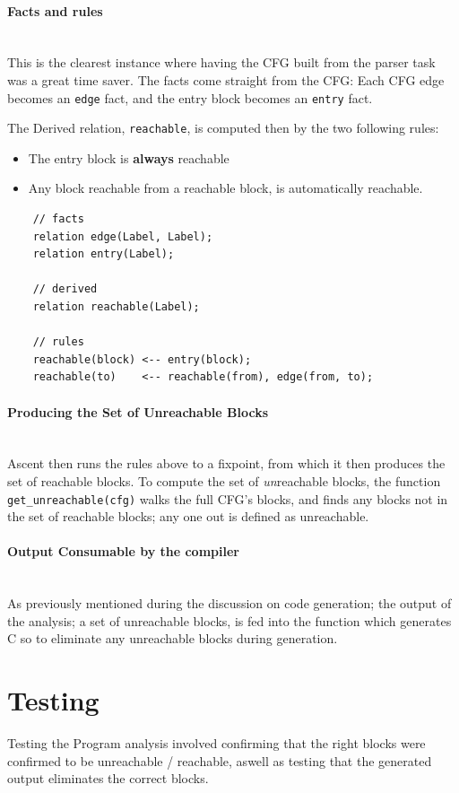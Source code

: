 \documentclass[11pt,a4paper,oneside]{report}
\begin{document}
	\paragraph{Facts and rules}\mbox{}\\
	This is the clearest instance where having the CFG built from the parser task was a great time saver. The facts come straight from the CFG: Each CFG edge becomes an \texttt{edge} fact, and the entry block becomes an \texttt{entry} fact. 
	
	The Derived relation, \texttt{reachable}, is computed then by the two following rules: 
	\begin{itemize}
		\item The entry block is \textbf{always} reachable
		\item Any block reachable from a reachable block, is automatically reachable. 
	\end{itemize}
	
	\begin{lstlisting}
	// facts
	relation edge(Label, Label);
	relation entry(Label);
	
	// derived
	relation reachable(Label);
	
	// rules
	reachable(block) <-- entry(block);
	reachable(to)    <-- reachable(from), edge(from, to);
\end{lstlisting}
	
	\paragraph{Producing the Set of Unreachable Blocks}\mbox{}\\
	Ascent then runs the rules above to a fixpoint, from which it then produces the set of reachable blocks. To compute the set of \textit{un}reachable blocks, the function \texttt{get\_unreachable(cfg)} walks the full CFG's blocks, and finds any blocks not in the set of reachable blocks; any one out is defined as unreachable. 
	
	\paragraph{Output Consumable by the compiler}\mbox{}\\
	As previously mentioned during the discussion on code generation; the output of the analysis; a set of unreachable blocks, is fed into the function which generates C so to eliminate any unreachable blocks during generation. 
	
	
	\section{Testing}
	\begin{testbox}
		Testing the Program analysis involved confirming that the right blocks were confirmed to be unreachable / reachable, aswell as testing that the generated output eliminates the correct blocks. 
	\end{testbox}
	
\end{document}
